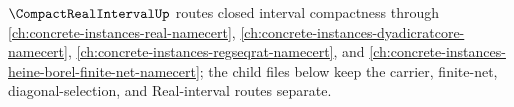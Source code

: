 $\CompactRealIntervalUp$ routes closed interval compactness through \autoref{ch:concrete-instances-real-namecert}, \autoref{ch:concrete-instances-dyadicratcore-namecert}, \autoref{ch:concrete-instances-regseqrat-namecert}, and \autoref{ch:concrete-instances-heine-borel-finite-net-namecert}; the child files below keep the carrier, finite-net, diagonal-selection, and Real-interval routes separate.






